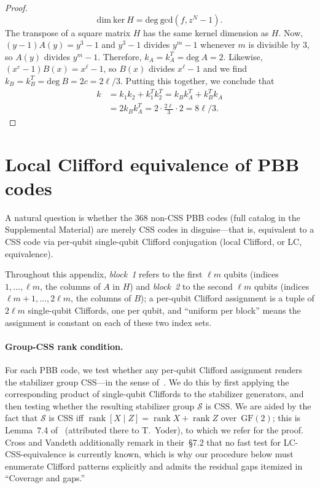 \documentclass[aps,prxquantum,twocolumn,superscriptaddress,nofootinbib]{revtex4-2}
\begin{document}
\begin{proof}
\begin{equation}
\textrm{dim}\ \textrm{ker}\ H = \textrm{deg}\ \textrm{gcd}(f, z^N-1).
\end{equation}
The transpose of a square matrix $H$ has the same kernel dimension as $H$. Now, $(y-1)A(y)=y^3-1$ and $y^3-1$ divides $y^m-1$ whenever $m$ is divisible by 3, so $A(y)$ divides $y^m-1$. Therefore, $k_A=k_A^T=\textrm{deg}\ A=2$. Likewise, $(x^c-1)B(x)=x^\ell-1$, so $B(x)$ divides $x^\ell-1$ and we find $k_B=k_B^T=\textrm{deg}\ B=2c=2\ell/3$. Putting this together, we conclude that
\begin{align}
k & = k_1k_2+k_1^Tk_2^T = k_Bk_A^T + k_B^Tk_A \\
& = 2k_Bk_A^T = 2\cdot \frac{2\ell}{3}\cdot 2 = 8\ell/3.  %
\end{align}
\end{proof}

\section{Local Clifford equivalence of PBB codes}
\label{app:lc}

A natural question is whether the 368 non-CSS PBB codes (full catalog in the Supplemental Material) are merely CSS codes in disguise---that is, equivalent to a CSS code via per-qubit single-qubit Clifford conjugation (local Clifford, or LC, equivalence).

Throughout this appendix, \emph{block~1} refers to the first $\ell m$ qubits (indices $1,\dots,\ell m$, the columns of $A$ in $H$) and \emph{block~2} to the second $\ell m$ qubits (indices $\ell m{+}1,\dots,2\ell m$, the columns of $B$); a per-qubit Clifford assignment is a tuple of $2\ell m$ single-qubit Cliffords, one per qubit, and ``uniform per block'' means the assignment is constant on each of these two index sets.

\paragraph{Group-CSS rank condition.}
For each PBB code, we test whether any per-qubit Clifford assignment renders the stabilizer group CSS---in the sense of~\cite{calderbank1996good,steane1996multiple}.
We do this by first applying the corresponding product of single-qubit Cliffords to the stabilizer generators, and then testing whether the resulting stabilizer group $\mathcal{S}$ is CSS.
We are aided by the fact that $\mathcal{S}$ is CSS iff $\operatorname{rank}[X \mid Z] = \operatorname{rank} X + \operatorname{rank} Z$ over~$\mathrm{GF}(2)$; this is Lemma~7.4 of~\cite{cross2025small} (attributed there to T.~Yoder), to which we refer for the proof.
Cross and Vandeth additionally remark in their~\S7.2 that no fast test for LC-CSS-equivalence is currently known, which is why our procedure below must enumerate Clifford patterns explicitly and admits the residual gaps itemized in ``Coverage and gaps.''
\end{document}
